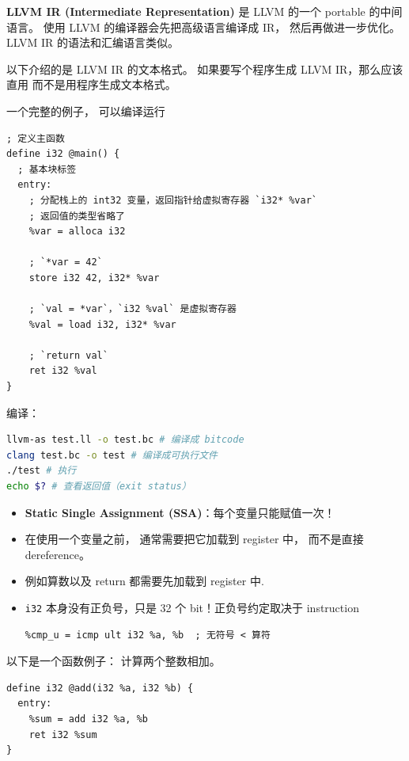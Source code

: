 

\textbf{LLVM IR (Intermediate Representation)} 是 LLVM 的一个 portable 的中间语言。 使用 LLVM 的编译器会先把高级语言编译成 IR， 然后再做进一步优化。 LLVM IR 的语法和汇编语言类似。

以下介绍的是 LLVM IR 的文本格式。 如果要写个程序生成 LLVM IR，那么应该直用  而不是用程序生成文本格式。

一个完整的例子， 可以编译运行
\begin{lstlisting}[language=none,caption=test.ll]
; 定义主函数
define i32 @main() {
  ; 基本块标签
  entry:
    ; 分配栈上的 int32 变量，返回指针给虚拟寄存器 `i32* %var`
    ; 返回值的类型省略了
    %var = alloca i32

    ; `*var = 42`
    store i32 42, i32* %var

    ; `val = *var`，`i32 %val` 是虚拟寄存器
    %val = load i32, i32* %var

    ; `return val`
    ret i32 %val
}
\end{lstlisting}

编译：
\begin{lstlisting}[language=bash]
llvm-as test.ll -o test.bc # 编译成 bitcode
clang test.bc -o test # 编译成可执行文件
./test # 执行
echo $? # 查看返回值（exit status）
\end{lstlisting}

\begin{itemize}
\item \textbf{Static Single Assignment (SSA)}：每个变量只能赋值一次！
\item  在使用一个变量之前， 通常需要把它加载到 register 中， 而不是直接 dereference。
\item 例如算数以及 return 都需要先加载到 register 中.
\item \verb`i32` 本身没有正负号，只是 32 个 bit！正负号约定取决于 instruction
\begin{lstlisting}[language=none]
%cmp_s = icmp slt i32 %a, %b  ; 有符号 < 算符
%cmp_u = icmp ult i32 %a, %b  ; 无符号 < 算符
\end{lstlisting}
\end{itemize}

以下是一个函数例子： 计算两个整数相加。
\begin{lstlisting}[language=none]
define i32 @add(i32 %a, i32 %b) {
  entry:
    %sum = add i32 %a, %b
    ret i32 %sum
}
\end{lstlisting}

